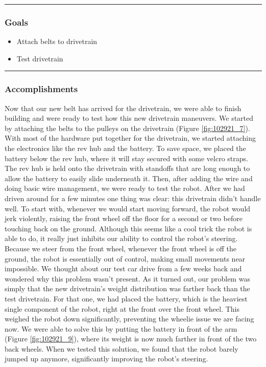 \noindent\hfil\rule{\textwidth}{.4pt}\hfil
\subsubsection*{Goals}
\begin{itemize}
    \item Attach belts to drivetrain
	\item Test drivetrain


\end{itemize} 

\noindent\hfil\rule{\textwidth}{.4pt}\hfil

\subsubsection*{Accomplishments}
Now that our new belt has arrived for the drivetrain, we were able to finish building and were ready to test how this new drivetrain maneuvers. We started by attaching the belts to the pulleys on the drivetrain (Figure \ref{fig:102921_7}). With most of the hardware put together for the drivetrain, we started attaching the electronics like the rev hub and the battery. To save space, we placed the battery below the rev hub, where it will stay secured with some velcro straps. The rev hub is held onto the drivetrain with standoffs that are long enough to allow the battery to easily slide underneath it. Then, after adding the wire and doing basic wire management, we were ready to test the robot.
After we had driven around for a few minutes one thing was clear: this drivetrain didn’t handle well. To start with, whenever we would start moving forward, the robot would jerk violently, raising the front wheel off the floor for a second or two before touching back on the ground. Although this seems like a cool trick the robot is able to do, it really just inhibits our ability to control the robot's steering. Because we steer from the front wheel, whenever the front wheel is off the ground, the robot is essentially out of control, making small movements near impossible. We thought about our test car drive from a few weeks back and wondered why this problem wasn’t present. As it turned out, our problem was simply that the new drivetrain’s weight distribution was farther back than the test drivetrain. For that one, we had placed the battery, which is the heaviest single component of the robot, right at the front over the front wheel. This weighed the robot down significantly, preventing the wheelie issue we are facing now. We were able to solve this by putting the battery in front of the arm (Figure \ref{fig:102921_9}), where its weight is now much farther in front of the two back wheels. When we tested this solution, we found that the robot barely jumped up anymore, significantly improving the robot’s steering.
